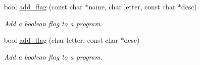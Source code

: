{\bf }\par
\begin{DoxyCompactItemize}
\item 
bool \hyperlink{class_anyarg_a15625aae27eac8deb3b8b6fd1adf70c4}{add\+\_\+flag} (const char $\ast$name, char letter, const char $\ast$desc)
\begin{DoxyCompactList}\small\item\em Add a boolean flag to a program. \end{DoxyCompactList}\item 
bool \hyperlink{class_anyarg_ab3d325be34ce29d29d890e240b3f592b}{add\+\_\+flag} (char letter, const char $\ast$desc)
\begin{DoxyCompactList}\small\item\em Add a boolean flag to a program. \end{DoxyCompactList}\end{DoxyCompactItemize}

